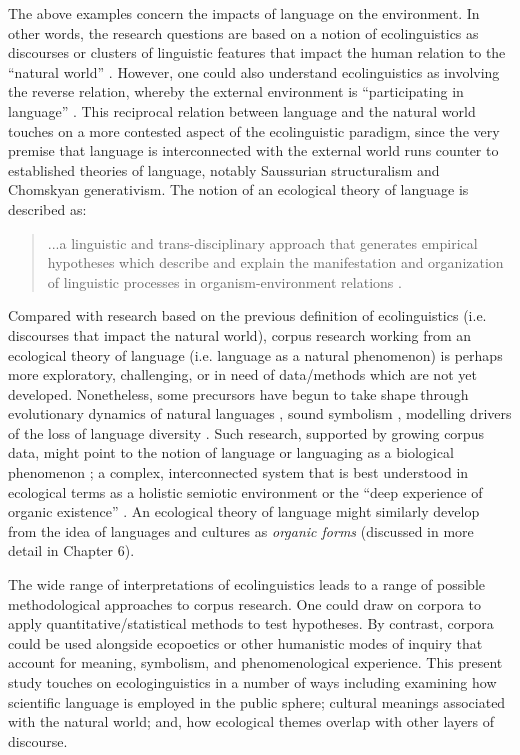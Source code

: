 The above examples concern the impacts of language on the environment. In other words, the research questions are based on a notion of ecolinguistics as discourses or clusters of linguistic features that impact the human relation to the ``natural world'' \citep{Stibbe2014b, Alexander2014a}. However, one could also understand ecolinguistics as involving the reverse relation, whereby the external environment is ``participating in language'' \citep{Cowley2014a}. This reciprocal relation between language and the natural world touches on a more contested aspect of the ecolinguistic paradigm, since the very premise that language is interconnected with the external world runs counter to established theories of language, notably Saussurian structuralism and Chomskyan generativism. The notion of an ecological theory of language is described as:

\begin{quote}
...a linguistic and trans-disciplinary approach that generates empirical hypotheses which describe and explain the manifestation and organization of linguistic processes in organism-environment relations \citep{Bang2014}. 
\end{quote}

Compared with research based on the previous definition of ecolinguistics (i.e. discourses that impact the natural world), corpus research working from an ecological theory of language (i.e. language as a natural phenomenon) is perhaps more exploratory, challenging, or in need of data/methods which are not yet developed. Nonetheless, some precursors have begun to take shape through evolutionary dynamics of natural languages \citep[e.g.,][]{Liberman2007a}, sound symbolism \citep{Nuckolls1999a}, modelling drivers of the loss of language diversity \citep{Amano2014c}. Such research, supported by growing corpus data, might point to the notion of language or languaging as a biological phenomenon  \citep{Kravchenko2016b}; a complex, interconnected system that is best understood in ecological terms as a holistic semiotic environment or the ``deep experience of organic existence'' \citep{Firth1957a}. An ecological theory of language might similarly develop from the idea of languages and cultures as \textit{organic forms} (discussed in more detail in Chapter 6).

The wide range of interpretations of ecolinguistics leads to a range of possible methodological approaches to corpus research. One could draw on corpora to apply quantitative/statistical methods to test hypotheses. By contrast, corpora could be used alongside ecopoetics or other humanistic modes of inquiry that account for meaning, symbolism, and phenomenological experience. This present study touches on ecologinguistics in a number of ways including examining how scientific language is employed in the public sphere; cultural meanings associated with the natural world; and, how ecological themes overlap with other layers of discourse. 

